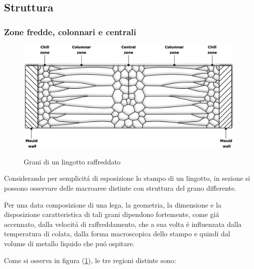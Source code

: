 \documentclass{article}
\begin{document}
        \clearpage
        \subsection{Struttura\label{Casting_strutt}}

            \subsubsection{Zone fredde, colonnari e centrali\label{Casting_strutt_zone}}

            \begin{figure}[h!]
                \centering
                 \label{fig:grain_casting}
                \includegraphics[width=\textwidth]{Sources/grain.eps}
                \caption{Grani di un lingotto raffreddato \autocite{Inkscape}}
            \end{figure}


            Considerando per semplicitá di esposizione lo stampo di un lingotto, in sezione si possono osservare
            delle macroaree distinte con struttura del grano differente. 
            
            Per una data composizione di una lega, la geometria, la dimensione e la disposizione caratteristica di tali grani dipendono fortemente, come giá
            accennato, dalla velocitá di raffreddamento, che a sua volta é influenzata dalla temperatura di colata, dalla forma 
            macroscopica dello stampo e quindi dal volume di metallo liquido che puó ospitare.

            Come si osserva in figura (\ref{fig:grain_casting}), le tre regioni distinte sono:
\end{document}
